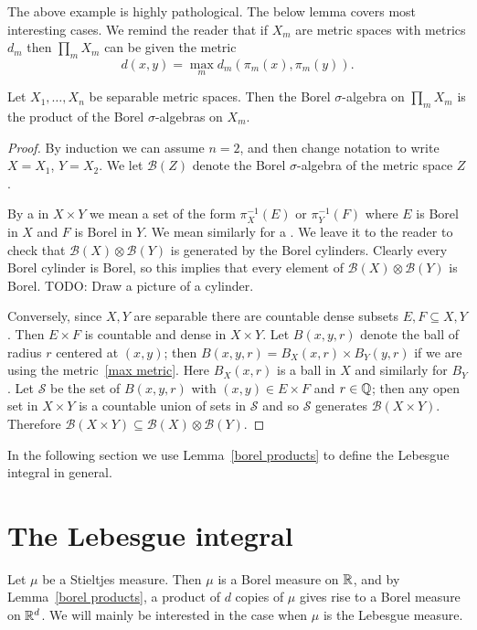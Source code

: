 The above example is highly pathological.
The below lemma covers most interesting cases.
We remind the reader that if $X_{m}$ are metric spaces with metrics $d_{m}$ then $\prod_{m} X_{m}$ can be given the metric
\begin{equation}
\label{max metric}
d(x, y) = \max_{m} d_{m}(\pi_{m}(x), \pi_{m}(y)).
\end{equation}

\begin{lemma}
\label{borel products}
Let $X_1, \dots, X_{n}$ be separable metric spaces.
Then the Borel $\sigma$-algebra on $\prod_{m} X_{m}$ is the product of the Borel $\sigma$-algebras on $X_{m}$.
\end{lemma}
\begin{proof}
By induction we can assume $n = 2$, and then change notation to write $X = X_1$, $Y = X_2$. We let $\mathcal B(Z)$ denote the Borel $\sigma$-algebra of the metric space $Z$.

By a  in $X \times Y$ we mean a set of the form $\pi_X^{-1}(E)$ or $\pi_Y^{-1}(F)$ where $E$ is Borel in $X$ and $F$ is Borel in $Y$.
We mean similarly for a .
We leave it to the reader to check that $\mathcal B(X) \otimes \mathcal B(Y)$ is generated by the Borel cylinders.
Clearly every Borel cylinder is Borel, so this implies that every element of $\mathcal B(X) \otimes \mathcal B(Y)$ is Borel.
TODO: Draw a picture of a cylinder.

Conversely, since $X, Y$ are separable there are countable dense subsets $E, F \subseteq X, Y$.
Then $E \times F$ is countable and dense in $X \times Y$.
Let $B(x, y, r)$ denote the ball of radius $r$ centered at $(x, y)$; then $B(x, y, r) = B_X(x, r) \times B_Y(y, r)$ if we are using the metric~\ref{max metric}. Here $B_X(x, r)$ is a ball in $X$ and similarly for $B_Y$.
Let $\mathcal S$ be the set of $B(x, y, r)$ with $(x, y) \in E \times F$ and $r \in \mathbb{Q}$; then any open set in $X \times Y$ is a countable union of sets in $\mathcal S$ and so $\mathcal S$ generates $\mathcal B(X \times Y)$.
Therefore $\mathcal B(X \times Y) \subseteq \mathcal B(X) \otimes \mathcal B(Y)$.
\end{proof}

In the following section we use Lemma~\ref{borel products} to define the Lebesgue integral in general.

\section{The Lebesgue integral}
Let $\mu$ be a Stieltjes measure.
Then $\mu$ is a Borel measure on $\mathbb{R}$, and by Lemma~\ref{borel products}, a product of $d$ copies of $\mu$ gives rise to a Borel measure on $\mathbb{R}^d$.
We will mainly be interested in the case when $\mu$ is the Lebesgue measure.

